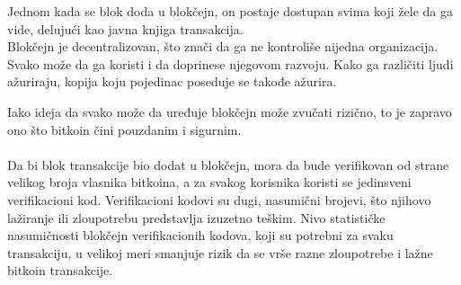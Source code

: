 \documentclass[a4paper]{article}
\begin{document}
\begin{table}[h!]

\begin{center}
\caption{Struktura blokova u blokčejnu.}

\captionsetup[subfloat]{labelformat=empty}
\quad
{}
\quad
{}

\label{tab:tabela_blok}
\end{center}
\end{table}

Jednom kada se blok doda u blokčejn, on postaje dostupan svima koji žele da ga vide, delujući kao javna knjiga transakcija.
\\
Blokčejn je decentralizovan, što znači da ga ne kontroliše nijedna organizacija. Svako može da ga koristi i da doprinese njegovom razvoju. Kako ga različiti ljudi ažuriraju, kopija koju pojedinac poseduje se takođe ažurira.

Iako ideja da svako može da uređuje blokčejn može zvučati rizično, to je zapravo ono što bitkoin čini pouzdanim i sigurnim.
\\
\\
Da bi blok transakcije bio dodat u blokčejn, mora da bude verifikovan od strane velikog broja vlasnika bitkoina, a za svakog korisnika koristi se jedinsveni verifikacioni kod.\cite{verifikacija}
Verifikacioni kodovi su dugi, nasumični brojevi, što njihovo lažiranje ili zloupotrebu predstavlja izuzetno teškim. Nivo statističke nasumičnosti blokčejn verifikacionih kodova, koji su potrebni za svaku transakciju, u velikoj meri smanjuje rizik da se vrše razne zloupotrebe i lažne bitkoin transakcije.
\end{document}

